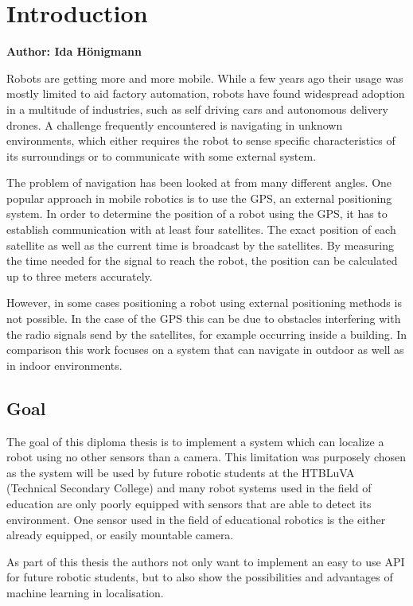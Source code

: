 \chapter{Introduction}

\textbf{Author: Ida Hönigmann}

\vspace{2mm}

Robots are getting more and more mobile. While a few years ago their usage was mostly limited to aid factory automation, robots have found widespread adoption in a multitude of industries, such as self driving cars and autonomous delivery drones.
A challenge frequently encountered is navigating in unknown environments, which either requires the robot to sense specific characteristics of its surroundings or to communicate with some external system.

The problem of navigation has been looked at from many different angles. One popular approach in mobile robotics is to use the GPS, an external positioning system. In order to determine the position of a robot using the GPS, it has to establish communication with at least four satellites. The exact position of each satellite as well as the current time is broadcast by the satellites. By measuring the time needed for the signal to reach the robot, the position can be calculated up to three meters accurately.

However, in some cases positioning a robot using external positioning methods is not possible. In the case of the GPS this can be due to obstacles interfering with the radio signals send by the satellites, for example occurring inside a building. In comparison this work focuses on a system that can navigate in outdoor as well as in indoor environments. 

\section{Goal}
The goal of this diploma thesis is to implement a system which can localize a robot using no other sensors than a camera. This limitation was purposely chosen as the system will be used by future robotic students at the HTBLuVA (Technical Secondary College) and many robot systems used in the field of education are only poorly equipped with sensors that are able to detect its environment. One sensor used in the field of educational robotics is the either already equipped, or easily mountable camera.

As part of this thesis the authors not only want to implement an easy to use API for future robotic students, but to also show the possibilities and advantages of machine learning in localisation.

